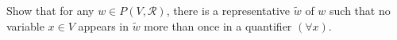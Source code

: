 Show that for any $w \in P(V, \mathcal{R})$, there is a representative $\tilde{w}$ of $w$ such that no variable $x \in V$ appears in $\tilde{w}$ more than once in a quantifier $(\forall x)$.
